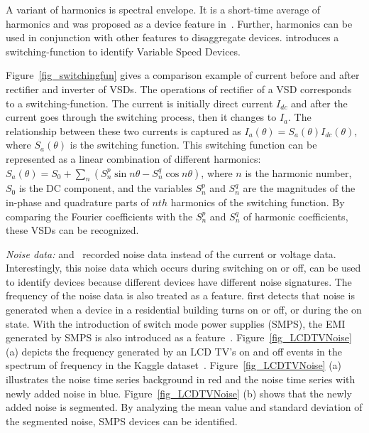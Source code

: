 A variant of harmonics is spectral envelope. 
It is a short-time average of harmonics 
and was proposed as a device feature in~\cite{leeb1995transient,laughman2003power}.
Further, harmonics can be used in conjunction with other features to disaggregate devices. 
\cite{wichakool2009modeling} introduces a switching-function 
to identify Variable Speed Devices. 
\iffalse
\manishc{you use VSD in a lot of places,
  could you use the full expansion when it is used the first time, and then
  use VSD}\huijuanc{VSD has been explained in page 5. Is it necessary for us to list 
  all the abbreviations before the introduction section?}. 
\fi  

Figure~\ref{fig_switchingfun} gives a comparison example
of current before and after rectifier and inverter of VSDs.
The operations of rectifier of a VSD corresponds to
a switching-function.
The current is initially direct current $I_{dc}$ and
after the current goes through the switching process,
then it changes to $I_a$.
The relationship between these two currents
is captured as $I_a(\theta)=S_a(\theta)I_{dc}(\theta)$, 
where $S_a(\theta)$ is the switching function. 
This switching function can be represented as 
a linear combination of different harmonics: 
$S_a(\theta)=S_0+\sum_n(S_n^p \sin n\theta - S_n^q \cos n\theta)$, 
where $n$ is the harmonic number, $S_0$ is the DC component,
and the variables $S_n^p$ and $S_n^q$ are the magnitudes of
the in-phase and quadrature parts of $nth$ harmonics of the
switching function. 
By comparing the Fourier coefficients with the $S_n^p$ and $S_n^q$ of harmonic coefficients,
these VSDs can be recognized.

\textit{Noise data:}
\cite{patel2007flick} and~\cite{gupta2010electrisense} recorded 
noise data instead of the current or voltage data.
Interestingly, this noise data
which occurs during switching on or off, 
can be used to identify devices
because different devices have different noise signatures. 
The frequency of the noise data is also treated as a feature. 
\cite{patel2007flick} first detects that noise is generated 
when a device in a residential building
turns on or off, or during the on state. 
With the introduction of switch mode power supplies (SMPS), 
the EMI generated by SMPS is also introduced as a feature~\cite{gupta2010electrisense}.
Figure~\ref{fig_LCDTVNoise} (a) depicts
the frequency generated by an LCD TV's on and
off events in the spectrum of frequency in the Kaggle dataset~\cite{kaggle2013energy}.
Figure~\ref{fig_LCDTVNoise} (a) illustrates the noise time series background in red and 
the noise time series with newly added noise in blue. 
Figure~\ref{fig_LCDTVNoise} (b) shows that the newly added noise is segmented. 
By analyzing the mean value and standard deviation of the segmented noise, 
SMPS devices can be identified. 
 

